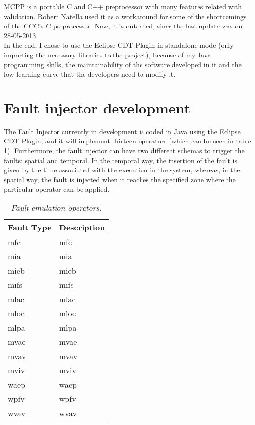 MCPP is a portable C and C++ preprocessor with many features related with validation. Robert Natella used it as a workaround for some of the shortcomings of the GCC's C preprocessor. Now, it is outdated, since the last update was on 28-05-2013.\\

In the end, I chose to use the Eclipse CDT Plugin in standalone mode (only importing the necessary libraries to the project), because of my Java programming skills, the maintainability of the software developed in it and the low learning curve that the developers need to modify it.\\

\clearpage
\section{Fault injector development}

The Fault Injector currently in development is coded in Java using the Eclipse CDT Plugin, and it will implement thirteen operators (which can be seen in table \ref{tab:faultEmulationOperators})\cite{duraes2005thesis}. Furthermore, the fault injector can have two different schemas to trigger the faults: spatial and temporal. In the temporal way, the insertion of the fault is given by the time associated with the execution in the system, whereas, in the spatial way, the fault is injected when it reaches the specified zone where the particular operator can be applied.

\begin{table}[!ht]
\begin{tabular}{|l|p{12cm}|}
\hline
\textbf{Fault Type}		& \multicolumn{1}{c|}{\textbf{Description}}		\\ \hline \hline
\acs{mfc}        				& \Acl{mfc}  									\\ \hline
\acs{mia}        				& \Acl{mia}  									\\ \hline
\acs{mieb}       				& \Acl{mieb} 									\\ \hline
\acs{mifs}       				& \Acl{mifs} 									\\ \hline
\acs{mlac}       				& \Acl{mlac} 									\\ \hline
\acs{mloc}       				& \Acl{mloc} 									\\ \hline
\acs{mlpa}       				& \Acl{mlpa} 									\\ \hline
\acs{mvae}       				& \Acl{mvae} 									\\ \hline
\acs{mvav}       				& \Acl{mvav} 									\\ \hline
\acs{mviv}       				& \Acl{mviv} 									\\ \hline
\acs{waep}       				& \Acl{waep} 									\\ \hline
\acs{wpfv}       				& \Acl{wpfv} 									\\ \hline
\acs{wvav}       				& \Acl{wvav} 									\\ \hline
\end{tabular}
\caption{\small \sl Fault emulation operators.\label{tab:faultEmulationOperators}}
\end{table}

